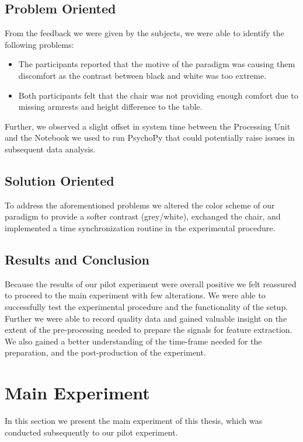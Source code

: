\subsection{Problem Oriented}\label{po}
From the feedback we were given by the subjects, we were able to identify the following problems:
\begin{itemize}
\item The participants reported that the motive of the paradigm was causing them discomfort as the contrast between black and white was too extreme.
\item Both participants felt that the chair was not providing enough comfort due to missing armrests and height difference to the table. 
\end{itemize}
Further, we observed a slight offset in system time between the Processing Unit and the Notebook we used to run PsychoPy that could potentially raise issues in subsequent data analysis.

\subsection{Solution Oriented}
To address the aforementioned problems we altered the color scheme of our paradigm to provide a softer contrast (grey/white), exchanged the chair, and implemented a time synchronization routine in the experimental procedure.

\subsection{Results and Conclusion}
Because the results of our pilot experiment were overall positive we felt reassured to proceed to the main experiment with few alterations. We were able to successfully test the experimental procedure and the functionality of the setup. Further we were able to record quality data and gained valuable insight on the extent of the pre-processing needed to prepare the signals for feature extraction. We also gained a better understanding of the time-frame needed for the preparation, and the post-production of the experiment.

\newpage
\section{Main Experiment}
In this section we present the main experiment of this thesis, which was conducted subsequently to our pilot experiment.
